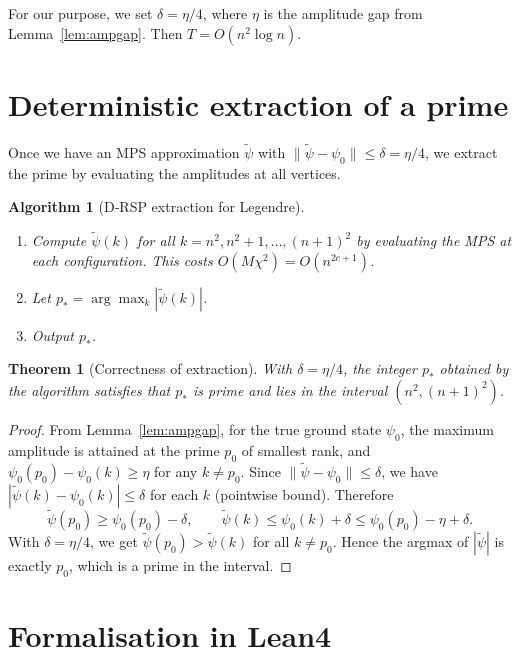 \documentclass[11pt,a4paper]{article}
\newtheorem{theorem}{Theorem}[section]
\newtheorem{algorithm}{Algorithm}[section]
\begin{document}
For our purpose, we set $\delta = \eta/4$, where $\eta$ is the amplitude gap from Lemma~\ref{lem:ampgap}. Then $T = O(n^2 \log n)$.

\section{Deterministic extraction of a prime}

Once we have an MPS approximation $\tilde{\psi}$ with $\|\tilde{\psi} - \psi_0\| \le \delta = \eta/4$, we extract the prime by evaluating the amplitudes at all vertices.

\begin{algorithm}[D‑RSP extraction for Legendre]\label{alg:drsp}
\begin{enumerate}
\item Compute $\tilde{\psi}(k)$ for all $k = n^2, n^2+1, \dots, (n+1)^2$ by evaluating the MPS at each configuration. This costs $O(M \chi^2) = O(n^{2c+1})$.
\item Let $p_* = \arg\max_k |\tilde{\psi}(k)|$.
\item Output $p_*$.
\end{enumerate}
\end{algorithm}

\begin{theorem}[Correctness of extraction]\label{thm:drsp}
With $\delta = \eta/4$, the integer $p_*$ obtained by the algorithm satisfies that $p_*$ is prime and lies in the interval $(n^2,(n+1)^2)$.
\end{theorem}
\begin{proof}
From Lemma~\ref{lem:ampgap}, for the true ground state $\psi_0$, the maximum amplitude is attained at the prime $p_0$ of smallest rank, and $\psi_0(p_0) - \psi_0(k) \ge \eta$ for any $k \neq p_0$. Since $\|\tilde{\psi} - \psi_0\| \le \delta$, we have $|\tilde{\psi}(k) - \psi_0(k)| \le \delta$ for each $k$ (pointwise bound). Therefore
\[
\tilde{\psi}(p_0) \ge \psi_0(p_0) - \delta,\qquad
\tilde{\psi}(k) \le \psi_0(k) + \delta \le \psi_0(p_0) - \eta + \delta.
\]
With $\delta = \eta/4$, we get $\tilde{\psi}(p_0) > \tilde{\psi}(k)$ for all $k \neq p_0$. Hence the argmax of $|\tilde{\psi}|$ is exactly $p_0$, which is a prime in the interval.
\end{proof}

\section{Formalisation in Lean4}
\end{document}
